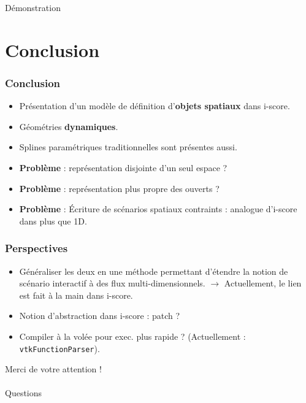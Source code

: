 \documentclass{beamer}
\begin{document}
\begin{frame}
    \centering\huge
    Démonstration
\end{frame}

\section{Conclusion}

\begin{frame}
    \frametitle{Conclusion}
    \Large
    \begin{itemize}
        \item Présentation d'un modèle de définition d'\textbf{objets spatiaux} dans i-score.
        \item Géométries \textbf{dynamiques}.
        \item Splines paramétriques traditionnelles sont présentes aussi.
        \item \textbf{Problème} : représentation disjointe d'un seul espace ? 
        \item \textbf{Problème} : représentation plus propre des ouverts ?
        \item \textbf{Problème} : Écriture de scénarios spatiaux contraints : analogue d'i-score dans plus que 1D.
    \end{itemize}
\end{frame}
\begin{frame}
    \frametitle{Perspectives}
    \Large
    \begin{itemize}
        \item Généraliser les deux en une méthode permettant d'étendre la notion de scénario interactif à des flux multi-dimensionnels.
        $\rightarrow$ Actuellement, le lien est fait à la main dans i-score.
        \item Notion d'abstraction dans i-score : patch ?
        \item Compiler à la volée pour exec. plus rapide ? (Actuellement : \texttt{vtkFunctionParser}).
    \end{itemize}
\end{frame}


\begin{frame}
    \large{}
    \centering
    Merci de votre attention !~\\
    
    \Huge{}~\\
    Questions
\end{frame}
\end{document}
